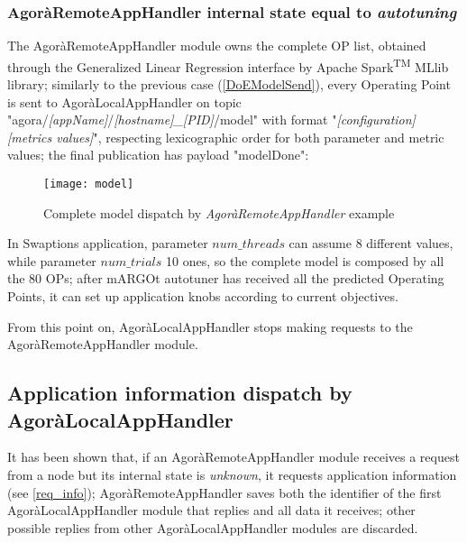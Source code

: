 \subsubsection{AgoràRemoteAppHandler internal state equal to \textit{autotuning}}\label{modelSend}

The AgoràRemoteAppHandler module owns the complete OP list, obtained through the Generalized Linear Regression interface by A\-pach\-e Spark\textsuperscript{TM} MLlib library; similarly to the previous case (\ref{DoEModelSend}), every Operating Point is sent to AgoràLocalAppHandler on topic "agora\slash{}\textit{[app\-Name]}\slash{}\textit{[host\-name]\_[PID]}\slash{}model" with format "\textit{[configuration] [metrics values]}", respecting lexicographic order for both parameter and metric values; the final publication has payload "modelDone":

\begin{figure}[H]

    \centering
    \texttt{[image: model]}
    \caption{Complete model dispatch by \textit{AgoràRemoteAppHandler} example}
    \label{fig:model}
    
\end{figure}

In Swaptions application, parameter $num\_threads$ can assume 8 different values, while parameter $num\_trials$ 10 ones, so the complete model is composed by all the 80 OPs; after mARGOt autotuner has received all the predicted Operating Points, it can set up application knobs according to current objectives.

From this point on, AgoràLocalAppHandler stops making requests to the AgoràRemoteAppHandler module.





\subsection{Application information dispatch by AgoràLocalAppHandler}\label{client_info}

It has been shown that, if an AgoràRemoteAppHandler module receives a request from a node but its internal state is \textit{unknown}, it requests application information (see \ref{req_info}); AgoràRemoteAppHandler saves both the identifier of the first AgoràLocalAppHandler module that replies and all data it receives; other possible replies from other AgoràLocalAppHandler modules are discarded.

